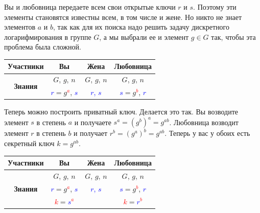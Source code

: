 Вы и любовница передаете всем свои открытые ключи $r$ и $s$. Поэтому эти элементы становятся известны всем, в том числе и жене. Но никто не знает элементов $a$ и $b$, так как для их поиска надо решить задачу дискретного логарифмирования в группе $G$, а мы выбрали ее и элемент $g\in G$ так, чтобы эта проблема была сложной.
\begin{center}
\begin{tabular}{|c|c|c|c|}
\hline
{\bf Участники}&{Вы}&{Жена}&{Любовница}\\
\hline
\multirow{2}{*}{\bf Знания}&{\textcolor{OliveGreen}{$G$}, \textcolor{OliveGreen}{$g$}, \textcolor{OliveGreen}{$n$}}&{\textcolor{OliveGreen}{$G$}, \textcolor{OliveGreen}{$g$}, \textcolor{OliveGreen}{$n$}}&{\textcolor{OliveGreen}{$G$}, \textcolor{OliveGreen}{$g$}, \textcolor{OliveGreen}{$n$}}\\
{}&{ \textcolor{blue}{$r$}$=$\textcolor{OliveGreen}{$ g$}\textcolor{red}{${}^a$}, \textcolor{blue}{$s$}}&{\textcolor{blue}{$r$, $s$}}&{ \textcolor{blue}{$s$}$=$\textcolor{OliveGreen}{$g$}\textcolor{red}{${}^b$}, \textcolor{blue}{$r$}}\\
\hline
\end{tabular}
\end{center}

Теперь можно построить приватный ключ. Делается это так. Вы возводите элемент $s$ в степень $a$ и получаете $s^a = (g^b)^a = g^{ab}$. Любовница возводит элемент $r$ в степень $b$ и получает $r^b = (g^a)^b = g^{ab}$. Теперь у вас у обоих есть секретный ключ $k = g^{ab}$.
\begin{center}
\begin{tabular}{|c|c|c|c|}
\hline
{\bf Участники}&{Вы}&{Жена}&{Любовница}\\
\hline
\multirow{3}{*}{\bf Знания}&{\textcolor{OliveGreen}{$G$}, \textcolor{OliveGreen}{$g$}, \textcolor{OliveGreen}{$n$}}&{\textcolor{OliveGreen}{$G$}, \textcolor{OliveGreen}{$g$}, \textcolor{OliveGreen}{$n$}}&{\textcolor{OliveGreen}{$G$}, \textcolor{OliveGreen}{$g$}, \textcolor{OliveGreen}{$n$}}\\
{}&{ \textcolor{blue}{$r$}$=$\textcolor{OliveGreen}{$ g$}\textcolor{red}{${}^a$}, \textcolor{blue}{$s$}}&{\textcolor{blue}{$r$, $s$}}&{ \textcolor{blue}{$s$}$=$\textcolor{OliveGreen}{$g$}\textcolor{red}{${}^b$}, \textcolor{blue}{$r$}}\\
{}&{ \textcolor{red}{$k$}$=$\textcolor{blue}{$s$}\textcolor{red}{${}^a$}}&{}&{ \textcolor{red}{$k$}$=$\textcolor{blue}{$r$}\textcolor{red}{${}^b$}}\\
\hline
\end{tabular}
\end{center}


